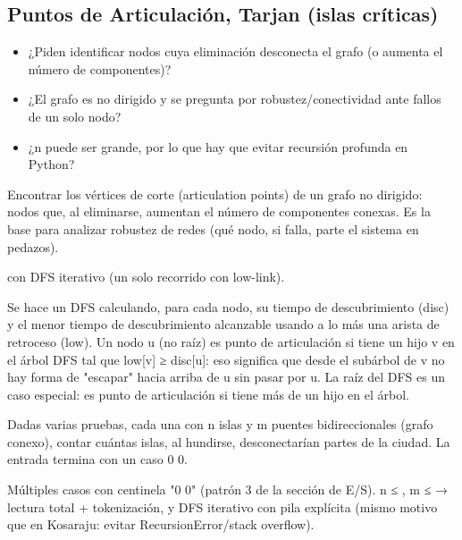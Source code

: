 \subsection{Puntos de Articulación, Tarjan (islas críticas)}
\label{alg:4-6}


\begin{itemize}
\item ¿Piden identificar nodos cuya eliminación desconecta el grafo (o aumenta el número de componentes)?
\item ¿El grafo es no dirigido y se pregunta por robustez/conectividad ante fallos de un solo nodo?
\item ¿n puede ser grande, por lo que hay que evitar recursión profunda en Python?
\end{itemize}

 Encontrar los vértices de corte (articulation points) de un grafo no dirigido: nodos que, al eliminarse, aumentan el número de componentes conexas. Es la base para analizar robustez de redes (qué nodo, si falla, parte el sistema en pedazos).

  con DFS iterativo (un solo recorrido con low-link).

 Se hace un DFS calculando, para cada nodo, su tiempo de descubrimiento (disc) y el menor tiempo de descubrimiento alcanzable usando a lo más una arista de retroceso (low). Un nodo u (no raíz) es punto de articulación si tiene un hijo v en el árbol DFS tal que low[v] ≥ disc[u]: eso significa que desde el subárbol de v no hay forma de "escapar" hacia arriba de u sin pasar por u. La raíz del DFS es un caso especial: es punto de articulación si tiene más de un hijo en el árbol.~\cite{tarjan1972}


Dadas varias pruebas, cada una con n islas y m puentes bidireccionales (grafo conexo), contar cuántas islas, al hundirse, desconectarían partes de la ciudad. La entrada termina con un caso 0 0.

 Múltiples casos con centinela "0 0" (patrón 3 de la sección de E/S). n ≤ , m ≤  → lectura total + tokenización, y DFS iterativo con pila explícita (mismo motivo que en Kosaraju: evitar RecursionError/stack overflow).


